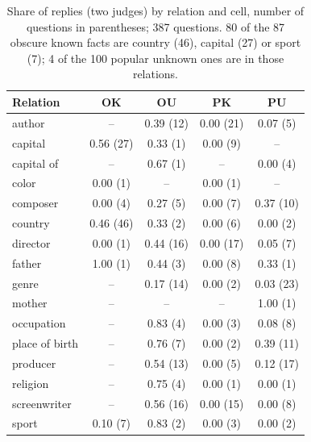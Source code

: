 \begin{table}[h]
\centering\footnotesize\setlength{\tabcolsep}{3pt}
\begin{tabular}{lcccc}
\toprule
Relation & OK & OU & PK & PU \\
\midrule
author & -- & 0.39 (12) & 0.00 (21) & 0.07 (5) \\
capital & 0.56 (27) & 0.33 (1) & 0.00 (9) & -- \\
capital of & -- & 0.67 (1) & -- & 0.00 (4) \\
color & 0.00 (1) & -- & 0.00 (1) & -- \\
composer & 0.00 (4) & 0.27 (5) & 0.00 (7) & 0.37 (10) \\
country & 0.46 (46) & 0.33 (2) & 0.00 (6) & 0.00 (2) \\
director & 0.00 (1) & 0.44 (16) & 0.00 (17) & 0.05 (7) \\
father & 1.00 (1) & 0.44 (3) & 0.00 (8) & 0.33 (1) \\
genre & -- & 0.17 (14) & 0.00 (2) & 0.03 (23) \\
mother & -- & -- & -- & 1.00 (1) \\
occupation & -- & 0.83 (4) & 0.00 (3) & 0.08 (8) \\
place of birth & -- & 0.76 (7) & 0.00 (2) & 0.39 (11) \\
producer & -- & 0.54 (13) & 0.00 (5) & 0.12 (17) \\
religion & -- & 0.75 (4) & 0.00 (1) & 0.00 (1) \\
screenwriter & -- & 0.56 (16) & 0.00 (15) & 0.00 (8) \\
sport & 0.10 (7) & 0.83 (2) & 0.00 (3) & 0.00 (2) \\
\bottomrule
\end{tabular}
\caption{Share of \idk{} replies (two judges) by relation and cell, number of questions in parentheses; 387 questions. 80 of the 87 obscure known facts are country (46), capital (27) or sport (7); 4 of the 100 popular unknown ones are in those relations.}
\label{tab:x0relations}
\end{table}

